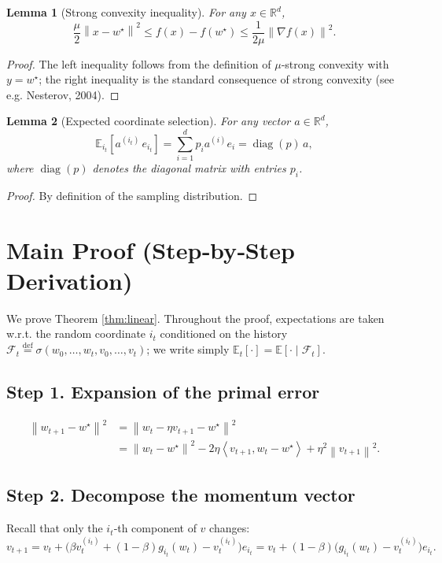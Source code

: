 \documentclass{article}
\newtheorem{lemma}{Lemma}
\newcommand{\E}{\mathbb{E}}
\newcommand{\R}{\mathbb{R}}
\newcommand{\norm}[1]{\left\|#1\right\|}
\newcommand{\ip}[2]{\left\langle #1,#2\right\rangle}
\newcommand{\diag}{\operatorname{diag}}
\begin{document}
\begin{lemma}[Strong convexity inequality]\label{lem:strong}
For any $x\in\R^{d}$,
\[
\frac{\mu}{2}\norm{x-w^{\star}}^{2}\le f(x)-f(w^{\star})\le\frac{1}{2\mu}\norm{\nabla f(x)}^{2}.
\]
\end{lemma}
\begin{proof}
The left inequality follows from the definition of $\mu$‑strong convexity with $y=w^{\star}$; the right inequality is the standard consequence of strong convexity (see e.g. Nesterov, 2004). \hfill\qedsymbol
\end{proof}

\begin{lemma}[Expected coordinate selection]\label{lem:expect}
For any vector $a\in\R^{d}$,
\[
\E_{i_t}[a^{(i_t)}\,e_{i_t}]=\sum_{i=1}^{d}p_i a^{(i)} e_i = \diag(p)\,a,
\]
where $\diag(p)$ denotes the diagonal matrix with entries $p_i$.
\end{lemma}
\begin{proof}
By definition of the sampling distribution. \hfill\qedsymbol
\end{proof}

\section*{Main Proof (Step‑by‑Step Derivation)}
We prove Theorem \ref{thm:linear}. Throughout the proof, expectations are taken w.r.t. the random coordinate $i_t$ conditioned on the history $\mathcal{F}_t\stackrel{\text{def}}{=}\sigma(w_0,\dots,w_t,v_0,\dots,v_t)$; we write simply $\E_t[\cdot]=\E[\cdot\mid\mathcal{F}_t]$.

\subsection*{Step 1.  Expansion of the primal error}
\begin{align}
\norm{w_{t+1}-w^{\star}}^{2}
&= \norm{w_t-\eta v_{t+1}-w^{\star}}^{2} \nonumber\\
&= \norm{w_t-w^{\star}}^{2}
-2\eta\ip{v_{t+1}}{w_t-w^{\star}}
+\eta^{2}\norm{v_{t+1}}^{2}.
\tag{Step 1}
\end{align}

\subsection*{Step 2.  Decompose the momentum vector}
Recall that only the $i_t$‑th component of $v$ changes:
\[
v_{t+1}=v_t+\bigl(\beta v_t^{(i_t)}+(1-\beta)g_{i_t}(w_t)-v_t^{(i_t)}\bigr)e_{i_t}
= v_t+(1-\beta)\bigl(g_{i_t}(w_t)-v_t^{(i_t)}\bigr)e_{i_t}.
\tag{Step 2}
\]
\end{document}
